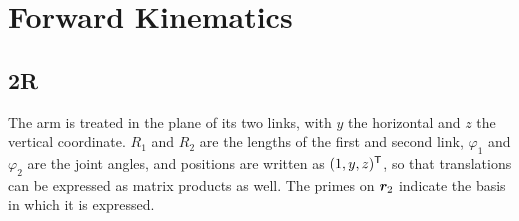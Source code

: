 \chapter{Forward Kinematics}
\label{ch:fk}

\section{2R}
\label{sec:2R}


\newcommand{\fkpoints}{%
  \coordinate (O) at (0,0);
  \coordinate (J) at (125:2);                 %
  \coordinate (E) at ($(J)+(165:1.6)$);       %
}

The arm is treated in the plane of its two links, with $y$ the horizontal
and $z$ the vertical coordinate. $R_1$ and $R_2$ are the lengths of the
first and second link, $\varphi_1$ and $\varphi_2$ are the joint angles,
and positions are written as $(1, y, z)^{\mathsf{T}}$, so that translations can be
expressed as matrix products as well. The primes on $\bm{r}_2$ indicate
the basis in which it is expressed. 

\begin{center}
\end{center}

